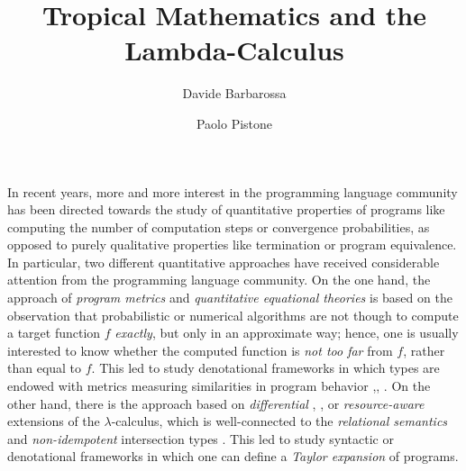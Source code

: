 \documentclass[submission,%
]{eptcs}
\title{Tropical Mathematics and the Lambda-Calculus}
\author{Davide Barbarossa
\institute{DISI, Universit\`a di Bologna}
\email{davide.barbarossa@unibo.it}
\and
\qquad\qquad Paolo Pistone
\institute{\qquad\qquad\qquad DISI, Universit\`a di Bologna}
\email{\qquad\qquad\qquad paolo.pistone2@unibo.it}
}
\begin{document}
\maketitle



In recent years, more and more interest in the programming language community has been directed towards the study of quantitative properties of programs like computing the number of computation steps or convergence probabilities, as opposed to purely qualitative properties like termination or program equivalence. 
In particular, two different quantitative approaches have received considerable attention from the programming language community. On the one hand, the approach of \emph{program metrics} \cite{Reed2010, Gaboardi2017, Gabo2019} and \emph{quantitative equational theories} \cite{Plotk} is based on the observation that probabilistic or numerical algorithms are not though to compute a target function $f$ \emph{exactly}, but only in an approximate way; hence, one is usually interested to know whether the computed function is \emph{not too far} from $f$, rather than equal to $f$. This led to study denotational frameworks in which types are endowed with metrics measuring similarities in program behavior \cite{Reed2010},\cite{Bonchi2018}, \cite{Geoffroy2020, PistoneLICS, PistoneFSCD2022}.
On the other hand, there is the approach based on \emph{differential} \cite{difflambda}, \cite{difflambda}, \cite{Manzo2013, Breuvart2018, PistoneLICS2022} or \emph{resource-aware} \cite{Boudol1993} extensions of the $\lambda$-calculus, which is well-connected to the \emph{relational semantics}\cite{Manzo2012, Manzo2013, dill} and \emph{non-idempotent} intersection types \cite{decarvalho2018, Mazza2016}.
This led to study syntactic or denotational frameworks in which one can define a \emph{Taylor expansion} of programs.
\end{document}
